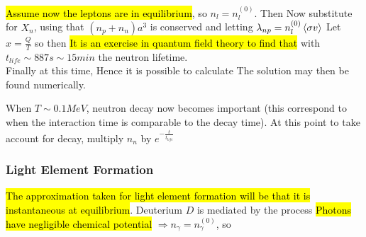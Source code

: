 \documentclass{article}
\begin{document}
\hl{Assume now the leptons are in equilibrium}, so $n_l = n_l^{(0)}$. Then 
Now substitute for $X_n$, using that $(n_p + n_n)a^3$ is conserved and letting $\lambda_{np}=n_l^{(0)} \braket{\sigma v}$
Let $x=\frac{Q}{T}$ so 
then 
\hl{It is an exercise in quantum field theory to find that }
with $t_{life} \sim 887s\sim 15min$ the neutron lifetime. \\
Finally at this time, 
Hence it is possible to calculate 
The solution may then be found numerically. 

\begin{remark}
When $T\sim 0.1 MeV$, neutron decay now becomes important (this correspond to when the interaction time is comparable to the decay time). At this point to take account for decay, multiply $n_n$ by $e^{-\frac{t}{t_{life}}}$
\end{remark}

\subsubsection*{Light Element Formation}
\hl{The approximation taken for light element formation will be that it is instantaneous at equilibrium}. Deuterium $D$ is mediated by the process 
\hl{Photons have negligible chemical potential} $\Rightarrow n_\gamma = n_\gamma^{(0)}$, so 
\end{document}
